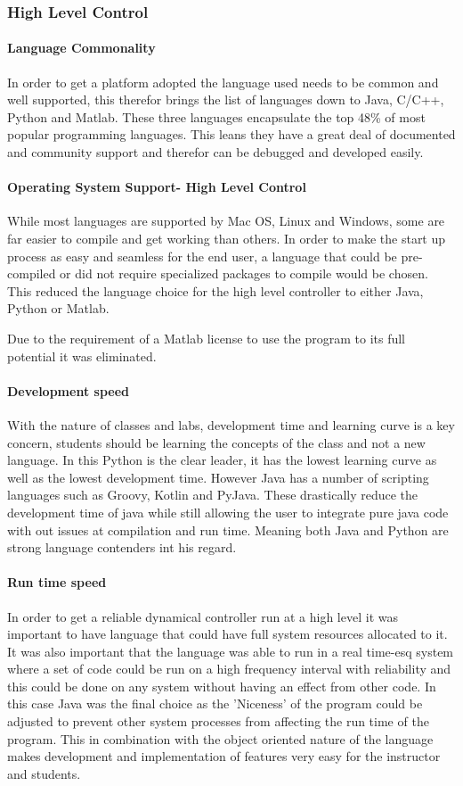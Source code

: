 \documentclass[conference]{IEEEtran}
\begin{document}
\subsubsection*{High Level Control}
\paragraph*{Language Commonality}
In order to get a platform adopted the language used needs to be common and well supported, this therefor brings the list of languages down to Java, C/C++, Python and Matlab. These three languages encapsulate the top 48\% of most popular programming languages\cite{tiobe}. This leans they have a great deal of documented and community support and therefor can be debugged and developed easily.
\paragraph*{Operating System Support- High Level Control}
    While most languages are supported by Mac OS, Linux and Windows, some are far easier to compile and get working than others. In order to make the start up process as easy and seamless for the end user, a language that could be pre-compiled or did not require specialized packages to compile would be chosen. This reduced the language choice for the high level controller to either Java, Python or Matlab.
    
    Due to the requirement of a Matlab license to use the program to its full potential it was eliminated. 
\paragraph*{Development speed}
    With the nature of classes and labs, development time and learning curve is a key concern, students should be learning the concepts of the class and not a new language. In this Python is the clear leader, it has the lowest learning curve as well as the lowest development time. However Java has a number of scripting languages such as Groovy, Kotlin and PyJava. These drastically reduce the development time of java while still allowing the user to integrate pure java code with out issues at compilation and run time. Meaning both Java and Python are strong language contenders int his regard.

\paragraph*{Run time speed}
In order to get a reliable dynamical controller run at a high level it was important to have language that could have full system resources allocated to it. It was also important that the language was able to run in a real time-esq system where a set of code could be run on a high frequency interval with reliability and this could be done on any system without having an effect from other code. In this case Java was the final choice as the 'Niceness' of the program could be adjusted to prevent other system processes from affecting the run time of the program. This in combination with the object oriented nature of the language makes development and implementation of features very easy for the instructor and students.\newline
\end{document}
